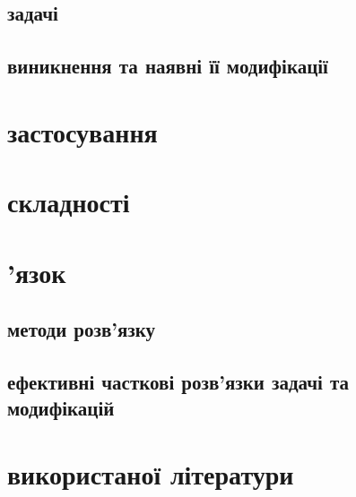 \documentclass[14pt]{article}
\begin{document}
\begin{spacing}{1.175}
        \subsection{ задачі}
        \subsection{ виникнення та наявні її модифікації}
    
    \section{ застосування}
    
    \section{ складності}

    \section{'язок}
        \subsection{ методи розв'язку}
        \subsection{ ефективні часткові розв'язки задачі та модифікацій}

    \section{ використаної літератури}

    \newpage
    

    




    
	\end{spacing}
\end{document}
